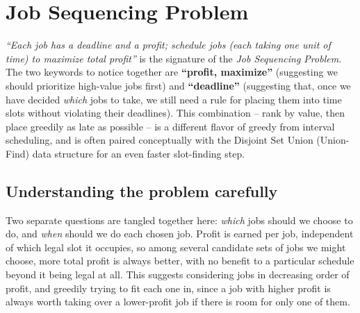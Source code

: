 \section{Job Sequencing Problem}
\label{sec:job-sequencing}


\begin{patternbox}
\emph{``Each job has a deadline and a profit; schedule jobs (each taking one
unit of time) to maximize total profit''} is the signature of the
\emph{Job Sequencing Problem}. The two keywords to notice together are
\textbf{``profit, maximize''} (suggesting we should prioritize high-value
jobs first) and \textbf{``deadline''} (suggesting that, once we have decided
\emph{which} jobs to take, we still need a rule for placing them into time
slots without violating their deadlines). This combination -- rank by value,
then place greedily as late as possible -- is a different flavor of greedy
from interval scheduling, and is often paired conceptually with the Disjoint
Set Union (Union-Find) data structure for an even faster slot-finding step.
\end{patternbox}

\subsection*{Understanding the problem carefully}

Two separate questions are tangled together here: \emph{which} jobs should
we choose to do, and \emph{when} should we do each chosen job. Profit is
earned per job, independent of which legal slot it occupies, so among
several candidate sets of jobs we might choose, more total profit is always
better, with no benefit to a particular schedule beyond it being legal at
all. This suggests considering jobs in decreasing order of profit, and
greedily trying to fit each one in, since a job with higher profit is always
worth taking over a lower-profit job if there is room for only one of them.

